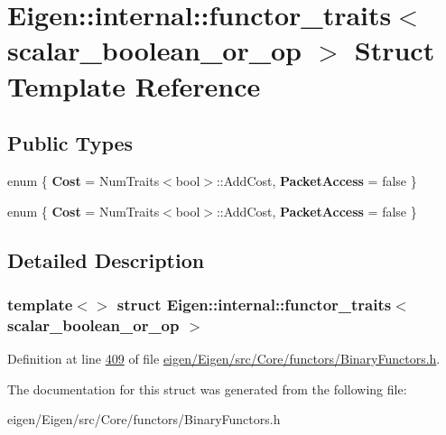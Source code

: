 \hypertarget{struct_eigen_1_1internal_1_1functor__traits_3_01scalar__boolean__or__op_01_4}{}\section{Eigen\+:\+:internal\+:\+:functor\+\_\+traits$<$ scalar\+\_\+boolean\+\_\+or\+\_\+op $>$ Struct Template Reference}
\label{struct_eigen_1_1internal_1_1functor__traits_3_01scalar__boolean__or__op_01_4}
\subsection*{Public Types}
\begin{DoxyCompactItemize}
\item 
\mbox{\label{struct_eigen_1_1internal_1_1functor__traits_3_01scalar__boolean__or__op_01_4_a6a64ce0301f23c24a2db31b7bf341528}} 
enum \{ {\bfseries Cost} = Num\+Traits$<$bool$>$\+:\+:Add\+Cost, 
{\bfseries Packet\+Access} = false
 \}
\item 
\mbox{\label{struct_eigen_1_1internal_1_1functor__traits_3_01scalar__boolean__or__op_01_4_a803577a75c8c51a41b55b4367c6f144a}} 
enum \{ {\bfseries Cost} = Num\+Traits$<$bool$>$\+:\+:Add\+Cost, 
{\bfseries Packet\+Access} = false
 \}
\end{DoxyCompactItemize}


\subsection{Detailed Description}
\subsubsection*{template$<$$>$\newline
struct Eigen\+::internal\+::functor\+\_\+traits$<$ scalar\+\_\+boolean\+\_\+or\+\_\+op $>$}



Definition at line \hyperlink{eigen_2_eigen_2src_2_core_2functors_2_binary_functors_8h_source_l00409}{409} of file \hyperlink{eigen_2_eigen_2src_2_core_2functors_2_binary_functors_8h_source}{eigen/\+Eigen/src/\+Core/functors/\+Binary\+Functors.\+h}.



The documentation for this struct was generated from the following file\+:\begin{DoxyCompactItemize}
\item 
eigen/\+Eigen/src/\+Core/functors/\+Binary\+Functors.\+h\end{DoxyCompactItemize}
